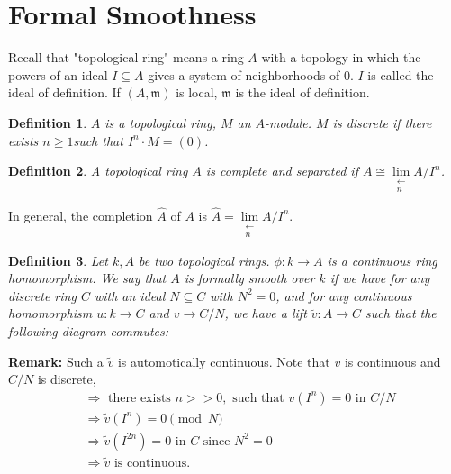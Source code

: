 \documentclass[cs4size]{article}
\newcommand{\su}{\subseteq}
\newcommand{\frm}{\mathfrak{m}}
\newcommand{\ra}{\rightarrow}
\newcommand{\Ra}{\Rightarrow}
\newtheorem{definition}{Definition}
\begin{document}
\section{Formal Smoothness}
Recall that "topological ring" means a ring $A$ with a topology in which the powers of an ideal $I\su A$ gives a system of neighborhoods of $0$. $I$ is called the ideal of definition. If $(A,\frm)$ is local, $\frm$ is the ideal of definition.

\begin{definition}
$A$ is a topological ring, $M$ an $A$-module. $M$ is discrete if there exists $n\geq 1$such that $I^n\cdot M=(0)$.
\end{definition}

\begin{definition}
A topological ring $A$ is complete and separated if $A\cong \lim\limits_{\substack{\longleftarrow\\ n}}A/I^n$.
\end{definition}
In general, the completion $\hat{A}$ of $A$ is $\hat{A}=\lim\limits_{\substack{\longleftarrow\\ n}}A/I^n$.

\begin{definition}
Let $k,A$ be two topological rings. $\phi: k\ra A$ is a continuous ring homomorphism. We say that $A$ is formally smooth over $k$ if we have for any discrete ring $C$ with an ideal $N\su C$ with $N^2=0$, and for any continuous homomorphism $u: k\ra C$ and $v\ra C/N$, we have a lift $\tilde{v}: A\ra C$ such that the following diagram commutes:

\begin{center}
\end{center}
\end{definition}

\textbf{Remark: }Such a $\tilde{v}$ is automotically continuous. Note that $v$ is continuous and $C/N$ is discrete,
\begin{align*}
&\Ra \text{ there exists } n>>0, \text{ such that } v(I^n)=0 \text{ in }C/N\\
&\Ra \tilde{v}(I^n)=0\pmod{N}\\
&\Ra \tilde{v}(I^{2n})=0 \text{ in }C \text{ since }N^2=0\\
&\Ra \tilde{v} \text{ is continuous}.
\end{align*}
\end{document}
